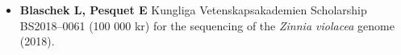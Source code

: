 \documentclass[11pt]{article}
\begin{document}
\vspace{-0.175cm}
\begin{itemize}[label={},itemindent=-9pt,leftmargin=24pt]
	\itemsep-0.1cm
	\item \textbf{Blaschek L, Pesquet E} Kungliga Vetenskapsakademien Scholarship BS2018--0061 (100 000 kr) for the sequencing of the \textit{Zinnia violacea} genome (2018). 
\end{itemize}
\newpage
\end{document}
